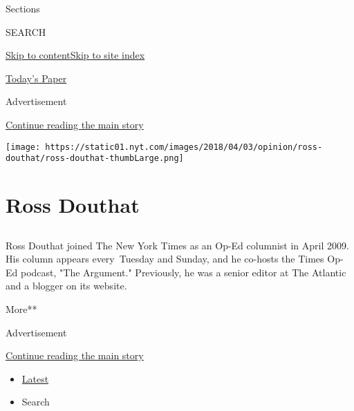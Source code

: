 Sections

SEARCH

\protect\hyperlink{site-content}{Skip to
content}\protect\hyperlink{site-index}{Skip to site index}

\href{https://myaccount.nytimes.com/auth/login?response_type=cookie\&client_id=vi}{}

\href{https://www.nytimes.com/section/todayspaper}{Today's Paper}

Advertisement

\protect\hyperlink{after-top}{Continue reading the main story}

\texttt{[image: https://static01.nyt.com/images/2018/04/03/opinion/ross-douthat/ross-douthat-thumbLarge.png]}

\hypertarget{ross-douthat}{%
\section{Ross Douthat}\label{ross-douthat}}

\subsection{}

Ross Douthat joined The New York Times as an Op-Ed columnist in April
2009. His column appears every~Tuesday and Sunday, and he co-hosts the
Times Op-Ed podcast, "The Argument." Previously, he was a senior editor
at The Atlantic and a blogger on its website.~

More**

Advertisement

\protect\hyperlink{after-mid1}{Continue reading the main story}

\begin{itemize}
\tightlist
\item
  \protect\hyperlink{stream-panel}{Latest}
\item
  Search
\end{itemize}

